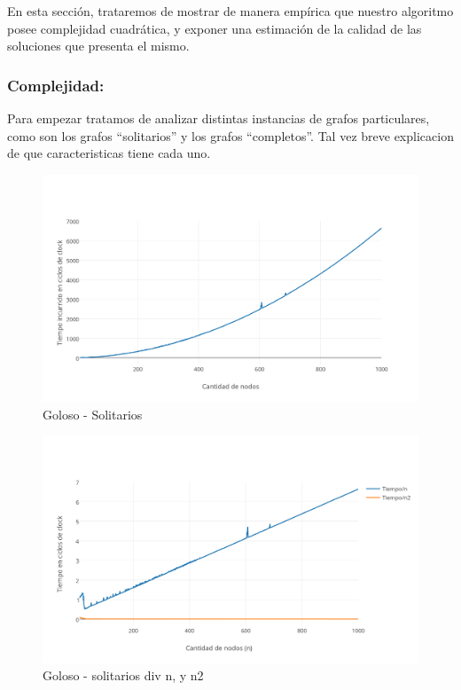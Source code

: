 En esta sección, trataremos de mostrar de manera empírica que nuestro algoritmo posee complejidad cuadrática, y exponer una estimación de la calidad de las soluciones que presenta el mismo.

\vspace*{0.6cm}

\subsubsection{Complejidad:}
\vspace*{0.3cm}

Para empezar tratamos de analizar distintas instancias de grafos particulares, como son los grafos ``solitarios'' y los grafos ``completos''. Tal vez breve explicacion de que caracteristicas tiene cada uno.

\begin{figure}[htb]
	\begin{center}
    		\includegraphics[scale=0.6]{imagenes/goloso-solitarios.png}
	\end{center}
	\caption{Goloso - Solitarios\label{fig:2A}}
\end{figure}

\begin{figure}[htb]
	\begin{center}
    		\includegraphics[scale=0.6]{imagenes/goloso-solitarios-div.png}
	\end{center}
	\caption{Goloso - solitarios div n, y n2\label{fig:2B}}
\end{figure}

